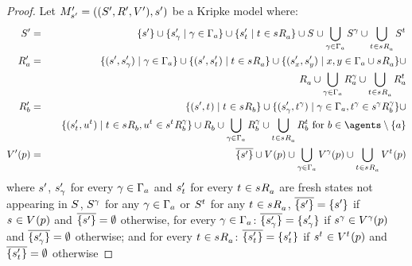 \begin{proof}
Let $\kPModelAndTupleP{\kStateSP}$ be a Kripke model where:
\begin{eqnarray*}
    \kStatesP &=& \{\kStateSP\} \cup \{\kStateSP_\gamma \mid \gamma \in \Gamma_\agentA\} \cup \{\kStateSP_{\kStateT} \mid \kStateT \in \kSuccessorsA{\kStateS}\} \cup \kStates \cup \bigcup_{\gamma \in \Gamma_\agentA} \kStates[\gamma] \cup \bigcup_{\kStateT \in \kSuccessorsA{\kStateS}} \kStates[\kStateT]\\
    \kAccessibilityPA &=& \{(\kStateSP, \kStateSP_\gamma) \mid \gamma \in \Gamma_\agentA\} \cup \{(\kStateSP, \kStateSP_{\kStateT}) \mid \kStateT \in \kSuccessorsA{\kStateS}\} \cup \{(\kStateSP_x, \kStateSP_y) \mid x, y \in \Gamma_\agentA \cup \kSuccessorsA{\kStateS}\} \cup \\&&\quad \kAccessibilityA \cup \bigcup_{\gamma \in \Gamma_\agentA} \kAccessibilityA[\gamma] \cup \bigcup_{\kStateT \in \kSuccessorsA{\kStateS}} \kAccessibilityA[\kStateT]\\
    \kAccessibilityPB &=& \{(\kStateSP, \kStateT) \mid \kStateT \in \kSuccessorsB{\kStateS}\} \cup \{(\kStateSP_\gamma, \kStateT[\gamma]) \mid \gamma \in \Gamma_\agentA, \kStateT[\gamma] \in \kSuccessorsB[\gamma]{\kStateS[\gamma]}\} \cup \\&&\quad \{(\kStateSP_{\kStateT}, \kStateU[\kStateT]) \mid \kStateT \in \kSuccessorsB{\kStateS}, \kStateU[\kStateT] \in \kSuccessorsB[\gamma]{\kStateS[\kStateT]}\} \cup \kAccessibilityB \cup \bigcup_{\gamma \in \Gamma_\agentA} \kAccessibilityB[\gamma] \cup \bigcup_{\kStateT \in \kSuccessorsA{\kStateS}} \kAccessibilityB[\kStateT] \text{ for } \agentB \in \agents \setminus \{\agentA\}\\
    \kValuationP(\atomP) &=& \overline{\{\kStateSP\}} \cup \kValuation(\atomP) \cup \bigcup_{\gamma \in \Gamma_\agentA} \kValuation[\gamma](\atomP) \cup \bigcup_{\kStateT \in \kSuccessorsA{\kStateS}} \kValuation[\kStateT](\atomP)
\end{eqnarray*}
where $\kStateSP$, $\kStateSP_\gamma$ for every $\gamma \in \Gamma_\agentA$ and $\kStateSP_{\kStateT}$ for every $\kStateT \in \kSuccessorsA{\kStateS}$ are fresh states not appearing in $\kStates$, $\kStates[\gamma]$ for any $\gamma \in \Gamma_\agentA$ or $\kStates[\kStateT]$ for any $\kStateT \in \kSuccessorsA{\kStateS}$, $\overline{\{\kStateSP\}} = \{\kStateSP\}$ if $\kStateS \in \kValuation(\atomP)$ and $\overline{\{\kStateSP\}} = \emptyset$ otherwise, for every $\gamma \in \Gamma_\agentA$: $\overline{\{\kStateSP_\gamma\}} = \{\kStateSP_\gamma\}$ if $\kStateS[\gamma] \in \kValuation[\gamma](\atomP)$ and $\overline{\{\kStateSP_\gamma\}} = \emptyset$ otherwise; and for every $\kStateT \in \kSuccessorsA{\kStateS}$: $\overline{\{\kStateSP_{\kStateT}\}} = \{\kStateSP_{\kStateT}\}$ if $\kStateS[\kStateT] \in \kValuation[\kStateT](\atomP)$ and $\overline{\{\kStateSP_{\kStateT}\}} = \emptyset$ otherwise


\end{proof}
